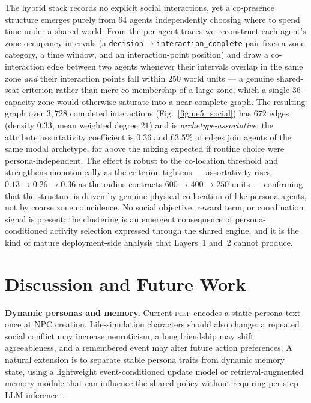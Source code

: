 \documentclass[conference]{IEEEtran}
\newcommand{\PCSP}{\textsc{pcsp}\xspace}
\begin{document}
The hybrid stack records no explicit social interactions, yet a
co-presence structure emerges purely from $64$ agents independently
choosing where to spend time under a shared world. From the per-agent
traces we reconstruct each agent's zone-occupancy intervals (a
\texttt{decision}$\rightarrow$\texttt{interaction\_complete} pair fixes
a zone category, a time window, and an interaction-point position) and
draw a co-interaction edge between two agents whenever their intervals
overlap in the same zone \emph{and} their interaction points fall within
$250$ world units --- a genuine shared-seat criterion rather than mere
co-membership of a large zone, which a single $36$-capacity zone would
otherwise saturate into a near-complete graph. The resulting graph over
$3{,}728$ completed interactions (Fig.~\ref{fig:ue5_social}) has
$672$ edges (density $0.33$, mean weighted degree $21$) and is
\emph{archetype-assortative}: the attribute assortativity coefficient is
$0.36$ and $63.5\%$ of edges join agents of the same modal archetype,
far above the mixing expected if routine choice were persona-independent.
The effect is robust to the co-location threshold and strengthens
monotonically as the criterion tightens --- assortativity rises
$0.13\rightarrow0.26\rightarrow0.36$ as the radius contracts
$600\rightarrow400\rightarrow250$ units --- confirming that the
structure is driven by genuine physical co-location of like-persona
agents, not by coarse zone coincidence. No social objective, reward
term, or coordination signal is present; the clustering is an emergent
consequence of persona-conditioned activity selection expressed through
the shared engine, and it is the kind of mature deployment-side analysis
that Layers~1 and~2 cannot produce.

\section{Discussion and Future Work}
\label{sec:discussion}

\textbf{Dynamic personas and memory.}
Current \PCSP encodes a static persona text once at NPC creation. Life-simulation
characters should also change: a repeated social conflict may increase
neuroticism, a long friendship may shift agreeableness, and a remembered event
may alter future action preferences. A natural extension is to separate stable
persona traits from dynamic memory state, using a lightweight event-conditioned
update model or retrieval-augmented memory module that can influence the shared
policy without requiring per-step LLM inference~\cite{park2023generative}.
\end{document}

